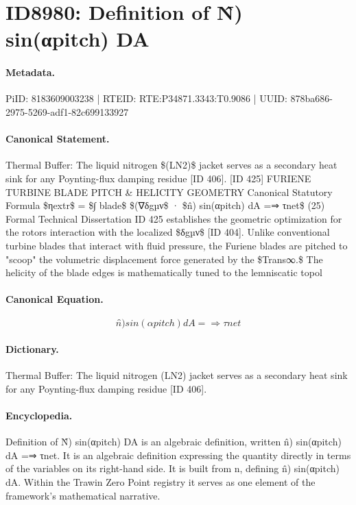 \section*{ID8980: Definition of N̂) sin(αpitch) DA}
\paragraph{Metadata.}
PiID: 8183609003238 | RTEID: RTE:P34871.3343:T0.9086 | UUID: 878ba686-2975-5269-adf1-82c699133927

\paragraph{Canonical Statement.}
Thermal Buffer: The liquid nitrogen \$(LN2)\$ jacket serves as a secondary heat sink for any Poynting-flux damping residue [ID 406]. [ID 425] FURIENE TURBINE BLADE PITCH \& HELICITY GEOMETRY Canonical Statutory Formula \$ηextr\$ = \$∫ blade\$ \$(∇δgµν\$ · \$n̂) sin(αpitch) dA =⇒ τnet\$ (25) Formal Technical Dissertation ID 425 establishes the geometric optimization for the rotors interaction with the localized \$δgµν\$ [ID 404]. Unlike conventional turbine blades that interact with fluid pressure, the Furiene blades are pitched to "scoop" the volumetric displacement force generated by the \$Trans∞.\$ The helicity of the blade edges is mathematically tuned to the lemniscatic topol

\paragraph{Canonical Equation.}
\[
n̂) sin(αpitch) dA =⇒ τnet
\]

\paragraph{Dictionary.}
Thermal Buffer: The liquid nitrogen (LN2) jacket serves as a secondary heat sink for any Poynting-flux damping residue [ID 406].

\paragraph{Encyclopedia.}
Definition of N̂) sin(αpitch) DA is an algebraic definition, written n̂) sin(αpitch) dA =⇒ τnet. It is an algebraic definition expressing the quantity directly in terms of the variables on its right-hand side. It is built from n, defining n̂) sin(αpitch) dA. Within the Trawin Zero Point registry it serves as one element of the framework's mathematical narrative.
